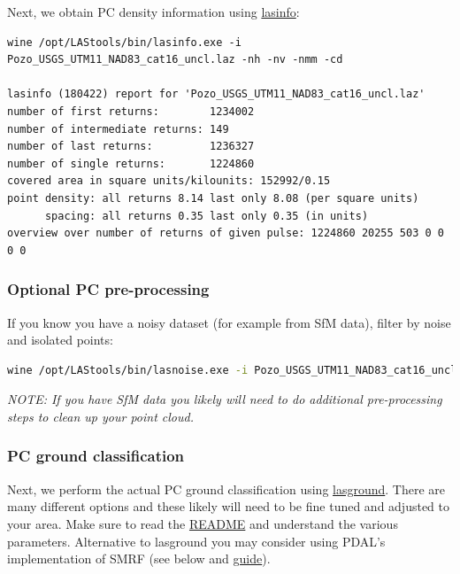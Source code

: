 \documentclass[a4paperpaper,,tablecaptionabove]{scrartcl}
\begin{document}
Next, we obtain PC density information using
\href{https://rapidlasso.com/lastools/lasinfo/}{lasinfo}:

\begin{lstlisting}
wine /opt/LAStools/bin/lasinfo.exe -i Pozo_USGS_UTM11_NAD83_cat16_uncl.laz -nh -nv -nmm -cd

lasinfo (180422) report for 'Pozo_USGS_UTM11_NAD83_cat16_uncl.laz'
number of first returns:        1234002
number of intermediate returns: 149
number of last returns:         1236327
number of single returns:       1224860
covered area in square units/kilounits: 152992/0.15
point density: all returns 8.14 last only 8.08 (per square units)
      spacing: all returns 0.35 last only 0.35 (in units)
overview over number of returns of given pulse: 1224860 20255 503 0 0 0 0
\end{lstlisting}

\hypertarget{optional-pc-pre-processing}{%
\subsubsection{Optional PC
pre-processing}\label{optional-pc-pre-processing}}

If you know you have a noisy dataset (for example from SfM data), filter
by noise and isolated points:

\begin{lstlisting}[language=bash]
wine /opt/LAStools/bin/lasnoise.exe -i Pozo_USGS_UTM11_NAD83_cat16_uncl.laz -step_xy 2 -step_z 1 -isolated 5 -olaz -o Pozo_USGS_UTM11_NAD83_cat16_uncln.laz
\end{lstlisting}

\emph{NOTE: If you have SfM data you likely will need to do additional
pre-processing steps to clean up your point cloud. }

\hypertarget{pc-ground-classification}{%
\subsubsection{PC ground
classification}\label{pc-ground-classification}}

Next, we perform the actual PC ground classification using
\href{https://rapidlasso.com/lastools/lasground/}{lasground}. There are
many different options and these likely will need to be fine tuned and
adjusted to your area. Make sure to read the
\href{http://www.cs.unc.edu/~isenburg/lastools/download/lasground_README.txt}{README}
and understand the various parameters. Alternative to lasground you may
consider using PDAL's implementation of SMRF (see below and
\href{https://pdal.io/workshop/exercises/analysis/ground/ground.html}{guide}).
\end{document}
